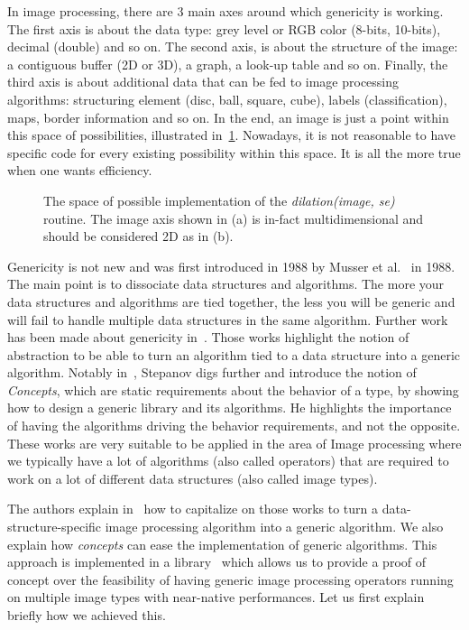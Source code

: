In image processing, there are 3 main axes around which genericity is working. The first axis is about the data type:
grey level or RGB color (8-bits, 10-bits), decimal (double) and so on. The second axis, is about the structure of the
image: a contiguous buffer (2D or 3D), a graph, a look-up table and so on. Finally, the third axis is about additional
data that can be fed to image processing algorithms: structuring element (disc, ball, square, cube), labels
(classification), maps, border information and so on. In the end, an image is just a point within this space of
possibilities, illustrated in~\ref{fig:gen.espaceSAV}. Nowadays, it is not reasonable to have specific code for every
existing possibility within this space. It is all the more true when one wants efficiency.

\begin{figure}[tbh]
  \centering
  \subfloat[]{}
  \hfil
  \subfloat[]{}
  \caption{The space of possible implementation of the \emph{dilation(image, se)} routine. The image axis shown in (a)
    is in-fact multidimensional and should be considered 2D as in (b).}
  \label{fig:gen.espaceSAV}
\end{figure}

Genericity is not new and was first introduced in 1988 by Musser et al.~\cite{musser.1988.generic} in 1988. The main
point is to dissociate data structures and algorithms. The more your data structures and algorithms are tied together,
the less you will be generic and will fail to handle multiple data structures in the same algorithm. Further work has
been made about genericity in~\cite{musser.1994.algorithm, dehnert.1998.fundamentals}. Those works highlight the notion
of abstraction to be able to turn an algorithm tied to a data structure into a generic algorithm. Notably
in~\cite{stepanov.2009.elements}, Stepanov digs further and introduce the notion of \emph{Concepts}, which are static
requirements about the behavior of a type, by showing how to design a generic library and its algorithms. He highlights
the importance of having the algorithms driving the behavior requirements, and not the opposite. These works are very
suitable to be applied in the area of Image processing where we typically have a lot of algorithms (also called
operators) that are required to work on a lot of different data structures (also called image types).

The authors explain in~\cite{roynard.2019.rrpr} how to capitalize on those works to turn a data-structure-specific image
processing algorithm into a generic algorithm. We also explain how \emph{concepts} can ease the implementation of
generic algorithms. This approach is implemented in a library~\cite{carlinet.2018.pylena} which allows us to provide a
proof of concept over the feasibility of having generic image processing operators running on multiple image types with
near-native performances. Let us first explain briefly how we achieved this.

